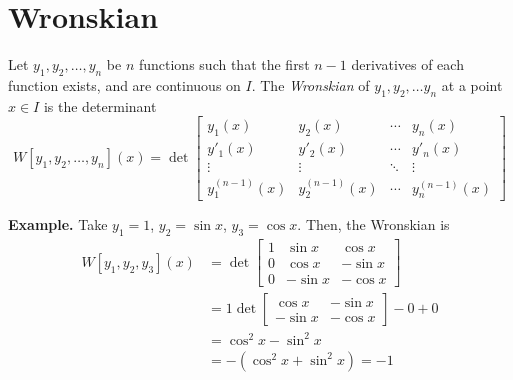 \documentclass[openany]{report}
\begin{document}
\section{Wronskian}
\begin{definition}[Wronskian]
    Let $y_1, y_2, \ldots, y_n$ be $n$ functions such that the first $n-1$ derivatives of each function exists, and are continuous on $I$. The \emph{Wronskian} of $y_1, y_2, \ldots y_n$ at a point $x \in I$ is the determinant
    \[W[y_1,y_2,\ldots,y_n](x) = \det\begin{bmatrix}
        y_1(x) & y_2(x) & \cdots & y_n(x)\\
        y'_1(x) & y'_2(x) & \cdots & y'_n(x)\\
        \vdots & \vdots & \ddots & \vdots\\
        y_1^{(n-1)}(x) & y_2^{(n-1)}(x) & \cdots & y_n^{(n-1)}(x)
    \end{bmatrix}\]
\end{definition}
\noindent
\textbf{Example.} Take $y_1 = 1$, $y_2 = \sin x$, $y_3 = \cos x$. Then, the Wronskian is 
\begin{align*}
    W[y_1, y_2,y_3](x) &= \det\begin{bmatrix}
        1 & \sin x & \cos x\\
        0 & \cos x & -\sin x\\
        0 & -\sin x & -\cos x
    \end{bmatrix} \\
    &= 1 \det \begin{bmatrix}
        \cos x & -\sin x\\
        -\sin x & -\cos x
    \end{bmatrix} - 0 + 0\\
    &= \cos^2x - \sin^2x\\
    &= -(\cos^2x + \sin^2x) = -1        
\end{align*}
\end{document}
